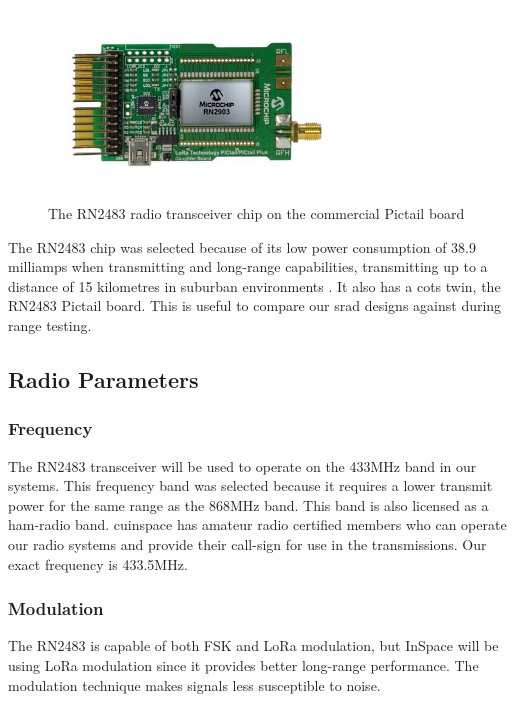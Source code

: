 \begin{figure}[H]
    \centering
    \includegraphics[width=3in]{assets/images/pictail.jpg}
    \caption{The RN2483 radio transceiver chip on the commercial Pictail board \cite{pictail-img}}
    \label{fig:pictail}
\end{figure}

The RN2483 chip was selected because of its low power consumption of 38.9 milliamps when transmitting \cite[Table
    2-3]{rn2483-datasheet} and long-range capabilities, transmitting up to a distance of 15 kilometres in suburban
environments \cite[1]{rn2483-datasheet}. It also has a \gls{cots} twin, the RN2483 Pictail board. This is useful to
compare our \gls{srad} designs against during range testing.

\subsection{Radio Parameters}

\subsubsection{Frequency}

The RN2483 transceiver will be used to operate on the 433MHz band in our systems. This frequency band was selected
because it requires a lower transmit power for the same range \cite[Table 2-5]{rn2483-datasheet} as the 868MHz band.
This band is also licensed as a \gls{ham-radio} band. \Gls{cuinspace} has amateur radio certified members who can
operate our radio systems and provide their call-sign for use in the transmissions. Our exact frequency is 433.5MHz.

\subsubsection{Modulation}

The RN2483 is capable of both FSK and LoRa modulation, but InSpace will be using LoRa modulation since it provides
better long-range performance. The modulation technique makes signals less susceptible to noise.

